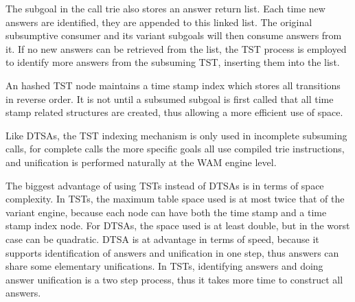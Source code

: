 The subgoal in the call trie also stores an answer return list. Each time new answers are identified, they are appended
to this linked list. The original subsumptive consumer and its variant subgoals will then consume answers from it. If no
new answers can be retrieved from the list, the TST process is employed to identify more answers from the subsuming TST,
inserting them into the list.

An hashed TST node maintains a time stamp index which stores all transitions in reverse order.
It is not until a subsumed subgoal is first called that all time stamp related structures are created, thus
allowing a more efficient use of space.

Like DTSAs, the TST indexing mechanism is only used in incomplete subsuming calls, for complete calls
the more specific goals all use compiled trie instructions, and unification is performed naturally at
the WAM engine level.

The biggest advantage of using TSTs instead of DTSAs is in terms of space complexity. In TSTs, the maximum table space
used is at most twice that of the variant engine, because each node can have both the time stamp and a time stamp index node.
For DTSAs, the space used is at least double, but in the worst
case can be quadratic. DTSA is at advantage in terms of speed, because it supports identification of answers and
unification in one step, thus answers can share some elementary unifications. In TSTs, identifying answers
and doing answer unification is a two step process, thus it takes more time to construct all answers. 
